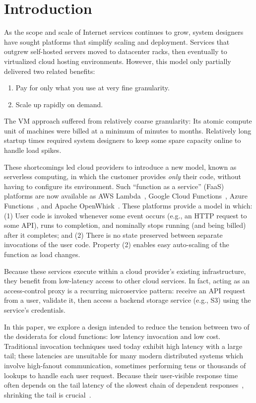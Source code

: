 \section{Introduction}
\label{sec:intro}

As the scope and scale of Internet services continues to grow, system designers
have sought platforms that simplify scaling and deployment.
Services that outgrew self-hosted servers moved to datacenter racks, then
eventually to virtualized cloud hosting environments.
However, this model only partially delivered two related benefits:
\begin{enumerate}
\item Pay for only what you use at very fine granularity.
\item Scale up rapidly on demand.
\end{enumerate}

The VM approach suffered from relatively coarse granularity:  Its atomic compute unit
of machines were billed at a minimum of minutes to months.  Relatively long startup
times required system designers to keep some spare capacity online to handle load
spikes.

These shortcomings led cloud providers to introduce a new model, known as
serverless computing, in which the customer provides \textit{only} their code,
without having to configure its environment.   Such ``function as a service''
(FaaS) platforms are now available as AWS Lambda~\cite{www-amazon-lambda}, Google
Cloud Functions~\cite{www-google-cf}, Azure Functions~\cite{www-microsoft-af}, and
Apache OpenWhisk~\cite{www-apache-openwhisk}.  These platforms provide a model in
which: (1)  User code is invoked whenever some event occurs (e.g., an HTTP
request to some API), runs to completion, and nominally stops running (and being
billed) after it completes; and (2)  There is no state preserved between
separate invocations of the user code.  Property (2) enables easy auto-scaling
of the function as load changes.

Because these services execute within a cloud provider's existing
infrastructure, they benefit from low-latency access to other cloud
services.  In fact, acting as an access-control proxy is a recurring microservice
pattern: receive an API request from a user, validate it, then access
a backend storage service (e.g., S3) using the service's credentials.

In this paper, we explore a design intended to reduce the tension between two of
the desiderata for cloud functions: low latency invocation and low cost.  Traditional
invocation techniques used today exhibit high latency with a
large tail; these latencies are
unsuitable for many modern distributed systems which involve
high-fanout communication, sometimes performing tens or thousands of
lookups to handle each user request.  Because their user-visible response time often
depends on the tail latency of the slowest chain of dependent
responses~\cite{Dean:cacm2013}, shrinking the tail is crucial~\cite{Jalaparti:sigcomm2013,
Xu:nsdi2013,Li:socc2014,Jeon:asplos2016}.

